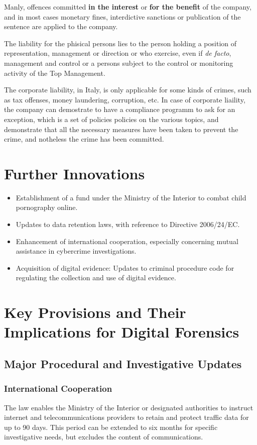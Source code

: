 Manly, offences committed \textbf{in the interest} or \textbf{for the
benefit} of the company, and in most cases monetary fines,
interdictive sanctions  or publication of the sentence are applied to
the company.

The liability for the phisical persons lies to the person holding a
position of representation, management or direction or who exercise,
even if \textit{de facto}, management and control or a persons subject
to the control or monitoring activity of the Top Management.

The corporate liability, in Italy, is only applicable for some kinds
of crimes, such as tax offenses, money laundering, corruption, etc. In
case of corporate liaility, the company can demostrate to have a
compliance programm to ask for an exception, which is a set of
policies policies on the various topics, and demonstrate that all the
necessary measures have been taken to prevent the crime, and notheless
the crime has been committed.

\section{Further Innovations}

\begin{itemize}
    \item Establishment of a fund under the Ministry of the Interior
      to combat child pornography online.
    \item Updates to data retention laws, with reference to Directive
      2006/24/EC.
    \item Enhancement of international cooperation, especially
      concerning mutual assistance in cybercrime investigations.
    \item Acquisition of digital evidence: Updates to criminal
      procedure code for regulating the collection and use of digital
      evidence.
\end{itemize}

\section{Key Provisions and Their Implications for Digital Forensics}

\subsection{Major Procedural and Investigative Updates}

\subsubsection{International Cooperation}
The law enables the Ministry of the Interior or designated authorities to instruct internet and telecommunications providers to retain and protect traffic data for up to 90 days. This period can be extended to six months for specific investigative needs, but excludes the content of communications.

